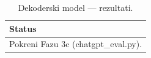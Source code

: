 \begin{table}[H]\centering
\caption{Dekoderski model --- rezultati.}\label{tab:decoder}
\begin{tabular}{l}
\toprule
Status \\
\midrule
Pokreni Fazu 3c (chatgpt\_eval.py). \\
\bottomrule
\end{tabular}
\end{table}

